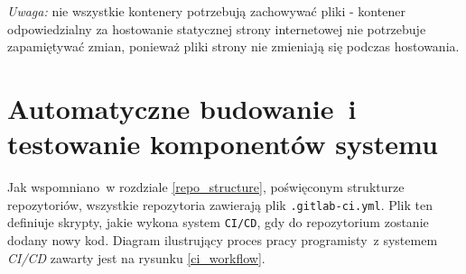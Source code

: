 \textit{Uwaga:} nie wszystkie kontenery potrzebują zachowywać pliki - kontener
odpowiedzialny za hostowanie statycznej strony internetowej nie potrzebuje
zapamiętywać zmian, ponieważ pliki strony nie zmieniają się podczas hostowania. 

\section{Automatyczne budowanie~i testowanie komponentów systemu}

Jak wspomniano~w rozdziale \ref{repo_structure}, poświęconym strukturze repozytoriów,
wszystkie repozytoria zawierają plik \texttt{.gitlab-ci.yml}. Plik ten definiuje skrypty,
jakie wykona system \texttt{CI/CD}, gdy do repozytorium zostanie dodany nowy kod.
Diagram ilustrujący proces pracy programisty~z systemem \textit{CI/CD} zawarty jest
na rysunku \ref{ci_workflow}.

